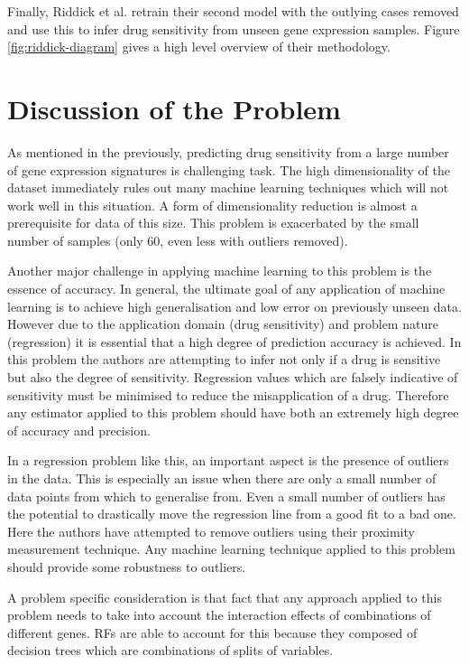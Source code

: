 \documentclass[journal]{IEEEtran}
\begin{document}
Finally, Riddick et al. retrain their second model with the outlying cases removed and use this to infer drug sensitivity from unseen gene expression samples. Figure \ref{fig:riddick-diagram} gives a high level overview of their methodology.

\section{Discussion of the Problem}
\label{sec:problem-discussion}
As mentioned in the previously, predicting drug sensitivity from a large number of gene expression signatures is challenging task. The high dimensionality of the dataset immediately rules out many machine learning techniques which will not work well in this situation. A form of dimensionality reduction is almost a prerequisite for data of this size. This problem is exacerbated by the small number of samples (only 60, even less with outliers removed).

Another major challenge in applying machine learning to this problem is the essence of accuracy. In general, the ultimate goal of any application of machine learning is to achieve high generalisation and low error on previously unseen data. However due to the application domain (drug sensitivity) and problem nature (regression) it is essential that a high degree of prediction accuracy is achieved. In this problem the authors are attempting to infer not only if a drug is sensitive but also the degree of sensitivity. Regression values which are falsely indicative of sensitivity must be minimised to reduce the misapplication of a drug. Therefore any estimator applied to this problem should have both an extremely high degree of accuracy and precision.

In a regression problem like this, an important aspect is the presence of outliers in the data. This is especially an issue when there are only a small number of data points from which to generalise from. Even a small number of outliers has the potential to drastically move the regression line from a good fit to a bad one. Here the authors have attempted to remove outliers using their proximity measurement technique. Any machine learning technique applied to this problem should provide some robustness to outliers.

A problem specific consideration is that fact that any approach applied to this problem needs to take into account the interaction effects of combinations of different genes. RFs are able to account for this because they composed of decision trees which are combinations of splits of variables.
\end{document}
